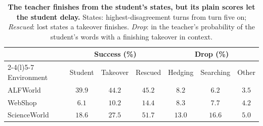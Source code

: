 \begin{table}[t]
\caption{\textbf{The teacher finishes from the student's states, but its plain scores let the student delay.} States: highest-disagreement turns from turn five on; \emph{Rescued}: lost states a takeover finishes. \emph{Drop}: in the teacher's probability of the student's words with a finishing takeover in context.}
\label{tab:drift}
\centering\small
\begin{tabular}{@{}lcccccc@{}}
\toprule
& \multicolumn{3}{c}{Success (\%)} & \multicolumn{3}{c}{Drop (\%)} \\
\cmidrule(lr){2-4}\cmidrule(l){5-7}
Environment & Student & Takeover & Rescued & Hedging & Searching & Other \\
\midrule\midrule
ALFWorld & $39.9$ & $44.2$ & $45.2$ & $8.2$ & $6.2$ & $3.5$ \\
WebShop & $6.1$ & $10.2$ & $14.4$ & $8.3$ & $7.7$ & $4.2$ \\
ScienceWorld & $18.6$ & $27.5$ & $51.7$ & $13.0$ & $16.6$ & $5.0$ \\
\bottomrule
\end{tabular}
\end{table}
